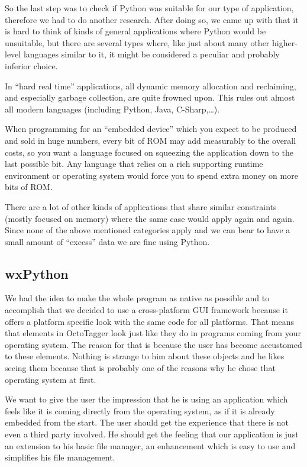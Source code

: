 So the last step was to check if Python was suitable for our type of application, therefore we had to do another research. After doing so, we came up with that it is hard to think of kinds of general applications where Python would be unsuitable, but there are several types where, like just about many other higher-level languages similar to it, it might be considered a peculiar and probably inferior choice.

In ``hard real time'' applications, all dynamic memory allocation and reclaiming, and especially garbage collection, are quite frowned upon. This rules out almost all modern languages (including Python, Java, C-Sharp,\ldots{}).

When programming for an ``embedded device'' which you expect to be produced and sold in huge numbers, every bit of ROM may add measurably to the overall costs, so you want a language focused on squeezing the application down to the last possible bit. Any language that relies on a rich supporting runtime environment or operating system would force you to spend extra money on more bits of ROM\@.

There are a lot of other kinds of applications that share similar constraints (mostly focused on memory) where the same case would apply again and again. Since none of the above mentioned categories apply and we can bear to have a small amount of ``excess'' data we are fine using Python.


\subsection{wxPython}
We had the idea to make the whole program as native as possible and to accomplish that we decided to use a cross-platform GUI framework because it offers a platform specific look with the same code for all platforms. That means that elements in OctoTagger look just like they do in programs coming from your operating system. The reason for that is because the user has become accustomed to these elements. Nothing is strange to him about these objects and he likes seeing them because that is probably one of the reasons why he chose that operating system at first.

We want to give the user the impression that he is using an application which feels like it is coming directly from the operating system, as if it is already embedded from the start. The user should get the experience that there is not even a third party involved. He should get the feeling that our application is just an extension to his basic file manager, an enhancement which is easy to use and simplifies his file management.

